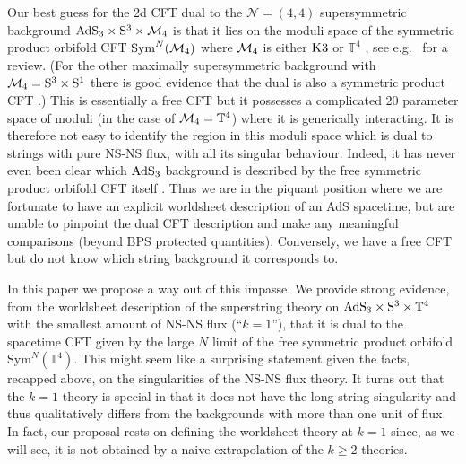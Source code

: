 \documentclass[12pt,a4paper]{article}
\begin{document}
Our best guess for the 2d CFT dual to the $\mathcal{N}=(4,4)$ supersymmetric background  ${\rm AdS}_3\times {\rm S}^3\times {\cal M}_4$ is that it lies on the moduli space of the symmetric product orbifold CFT $\mathrm{Sym}^N({\cal M}_4)$ where ${\cal M}_4$ is either ${\rm K3}$ or $\mathbb{T}^4$ \cite{Maldacena:1997re}, see e.g.\ \cite{David:2002wn} for a review. (For the other maximally supersymmetric background with ${\cal M}_4={\rm S}^3\times {\rm S}^1$ there is good evidence that the dual is also a symmetric product CFT \cite{Eberhardt:2017pty}.) This is essentially a free CFT but it possesses a complicated 20 parameter space of moduli (in the case of ${\cal M}_4=\mathbb{T}^4$) where it is generically interacting. It is therefore not easy to identify the region in this moduli space which is dual to strings with pure NS-NS flux, with all its singular behaviour. Indeed, it has never even been clear which ${\rm AdS}_3$ background is described by the free symmetric product orbifold CFT itself \cite{Seiberg:1999xz}. Thus we are in the piquant position where we are fortunate to have an explicit worldsheet description of an AdS spacetime, but are unable to pinpoint the dual CFT description and make any meaningful comparisons (beyond BPS protected quantities). Conversely, we have a free CFT but do not know which string background it corresponds to. 
\smallskip

In this paper we propose a way out of this impasse. We provide strong evidence, from the worldsheet description of the superstring theory on ${\rm AdS}_3\times {\rm S}^3\times \mathbb{T}^4$ with the smallest amount of NS-NS flux (``$k=1$''), that it is dual to the spacetime CFT given by the large $N$ limit of the free symmetric product orbifold $\mathrm{Sym}^N(\mathbb{T}^4)$. This might seem like a surprising statement given the facts, recapped above, on the singularities of the NS-NS flux theory. It turns out that the $k=1$ theory is special in that it does not have the long string singularity and thus qualitatively differs from the backgrounds with more than one unit of flux. 
In fact, our proposal rests on defining the worldsheet theory at $k=1$ since, as we will see, it is not obtained by a naive extrapolation of the $k\geq2$ theories. 
\end{document}
